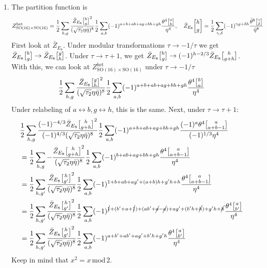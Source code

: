 \documentclass[11pt, class=article, crop=false]{standalone}
\begin{document}
\begin{enumerate}
	In both theories there are no NS-R or R-NS sectors at all, so there are no spacetime fermions, in particular no gravitino, and hence no spacetime supersymmetry. At the massless level this is $64 + 128$ bosons and no fermions.
	
	\item The partition function is
	\[
		Z_{\mathrm{SO}(16) \times \mathrm{SO}(16)}^{\mathrm{het}} 
		= \frac12 \sum_{h,g} \frac{\bar Z_{E_8}\twist hg ^2}{(\sqrt{\tau_2} \eta \bar \eta)^8} \frac12 \sum_{a,b} (-1)^{a+b+ab+ ag+bh+gh} \frac{\theta^4 \twist ab}{\eta^4}, 
		\quad \bar Z_{E_8}\twist hg = \frac12 \sum_{\gamma, \delta} (-1)^{\gamma g + \delta h} \frac{\bar \theta^8 \twist \gamma \delta}{\bar \eta^8}
	\]
	First look at $\bar Z_{E_8}$. Under modular transformations $\tau \to -1/\tau$ we get $\bar Z_{E_8}\twist hg \to \bar Z_{E_8} \twist gh$. Under $\tau \to \tau + 1$, we get $\bar Z_{E_8}\twist hg \to (-1)^{h-2/3} \bar Z_{E_8}\twist{h}{g+h}$. With this, we can look at $Z_{\mathrm{SO}(16) \times \mathrm{SO}(16)}^{\mathrm{het}}$ under $\tau \to -1/\tau$
	\[
		\frac12 \sum_{h,g} \frac{\bar Z_{E_8}\twist gh ^2}{(\sqrt{\tau_2} \eta \bar \eta)^8} \frac12 \sum_{a,b} (-1)^{a+b+ab+ ag+bh+gh} \frac{\theta^4 \twist ba}{\eta^4}
	\]
	Under relabeling of $a\leftrightarrow b, g\leftrightarrow h$, this is the same. Next, under $\tau \to \tau+1$:
	\[
	\begin{aligned}
		&\frac12 \sum_{h,g} \frac{(-1)^{-4/3} \bar Z_{E_8}\twist{h}{g+h}^2}{(-1)^{4/3} (\sqrt{\tau_2} \eta \bar \eta)^8} \frac12 \sum_{a,b} (-1)^{a+b+ab+ ag+bh+gh} \frac{(-1)^a \theta^4 \twist{a}{a+b-1}}{(-1)^{1/3} \eta^4}\\ 
		&= \frac12 \sum_{h,g} - \frac{ \bar Z_{E_8}\twist{h}{g+h}^2}{(\sqrt{\tau_2} \eta \bar \eta)^8} \frac12 \sum_{a,b} (-1)^{b+ab+ ag+bh+gh} \frac{\theta^4 \twist{a}{a+b-1}}{\eta^4}\\
		&=	\frac12 \sum_{h,g'} \frac{ \bar Z_{E_8}\twist{h}{g'}^2}{(\sqrt{\tau_2} \eta \bar \eta)^8} \frac12 \sum_{a,b} (-1)^{1+b+ab+ ag' + (a+b) h +g'h + h} \frac{\theta^4 \twist{a}{a+b-1}}{\eta^4}\\
		&= \frac12 \sum_{h,g'} \frac{ \bar Z_{E_8}\twist{h}{g'}^2}{(\sqrt{\tau_2} \eta \bar \eta)^8} \frac12 \sum_{a,b} (-1)^{\cancel 1 + (b' + a + \cancel 1) + (ab' + \cancel a - \cancel a) + ag' + (b' h + \cancel{h}) +g'h + \cancel h } \frac{\theta^4 \twist{a}{b'}}{\eta^4}\\
		&= \frac12 \sum_{h,g'} \frac{ \bar Z_{E_8}\twist{h}{g'}^2}{(\sqrt{\tau_2} \eta \bar \eta)^8} \frac12 \sum_{a,b} (-1)^{a + b' + a b' + a g' + b' h + g' h} \frac{\theta^4 \twist{a}{b'}}{\eta^4}\\
	\end{aligned}
	\]
	Keep in mind that $x^2 = x\, \mathrm{mod}\, 2$. 
	

\end{enumerate}
\end{document}
